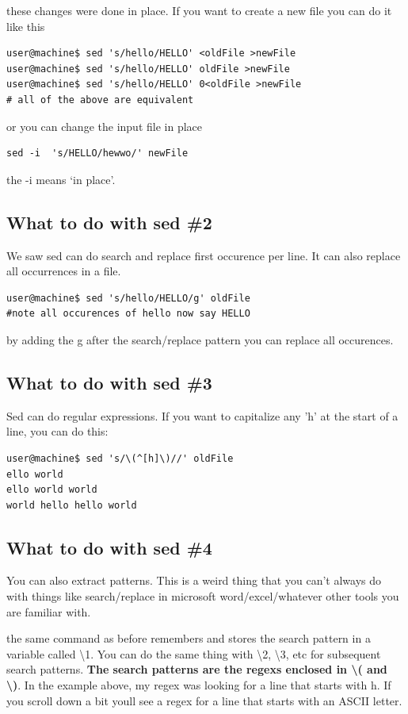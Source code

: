 \documentclass[10pt]{article}
\begin{document}
these changes were done in place. If you want to create a new file you can do it like this

\begin{lstlisting}[style=term]
user@machine$ sed 's/hello/HELLO' <oldFile >newFile
user@machine$ sed 's/hello/HELLO' oldFile >newFile
user@machine$ sed 's/hello/HELLO' 0<oldFile >newFile
# all of the above are equivalent
\end{lstlisting}

or you can change the input file in place

\begin{lstlisting}[style=term]
sed -i  's/HELLO/hewwo/' newFile
\end{lstlisting}

the -i means `in place'.

\subsection{What to do with sed \#2}
We saw sed can do search and replace first occurence per line. It can also replace all occurrences in a file.

\begin{lstlisting}[style=term]
user@machine$ sed 's/hello/HELLO/g' oldFile
#note all occurences of hello now say HELLO
\end{lstlisting}

by adding the g after the search/replace pattern you can replace all occurences.

\subsection{What to do with sed \#3}
Sed can do regular expressions. If you want to capitalize any 'h' at the start of a line, you can do this:

\begin{lstlisting}[style=term]
user@machine$ sed 's/\(^[h]\)//' oldFile
ello world
ello world world
world hello hello world
\end{lstlisting}

\subsection{What to do with sed \#4}
You can also extract patterns. This is a weird thing that you can't always do with things like search/replace in microsoft word/excel/whatever other tools you are familiar with.

the same command as before remembers and stores the search pattern in a variable called \textbackslash1. You can do the same thing with \textbackslash2, \textbackslash3, etc for subsequent search patterns. \textbf{The search patterns are the regexs enclosed in \textbackslash( and \textbackslash)}. In the example above, my regex was looking for a line that starts with h. If you scroll down a bit youll see a regex for a line that starts with an ASCII letter.
\end{document}
